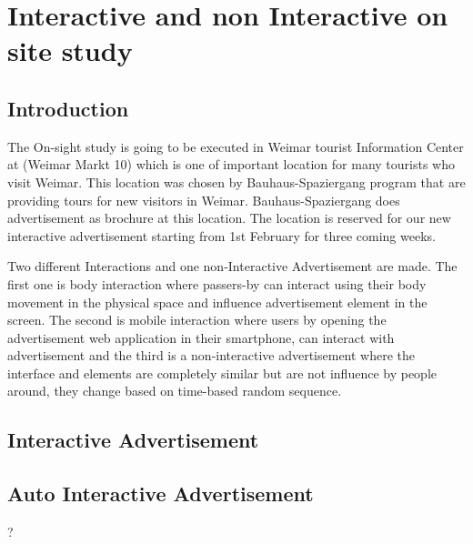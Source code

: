 \chapter{Interactive and non Interactive on site study} %

\label{Chapter8} %

\section{Introduction}

The On-sight study is going to be executed in Weimar tourist Information Center at (Weimar Markt 10) which is one of important location for many tourists who visit Weimar. This location was chosen by Bauhaus-Spaziergang program that are providing tours for new visitors in Weimar. Bauhaus-Spaziergang does advertisement as brochure at this location. The location is reserved for our new interactive advertisement starting from 1st February for three coming weeks. 

Two different Interactions and one non-Interactive Advertisement are made. The first one is body interaction where passers-by can interact using their body movement in the physical space and influence advertisement element in the screen. The second is mobile interaction where users by opening the advertisement web application in their smartphone, can interact with advertisement and the third is a non-interactive advertisement where the interface and elements are completely similar but are not influence by people around, they change based on time-based random sequence. 

\section{Interactive Advertisement}

\section{Auto Interactive Advertisement}
?

